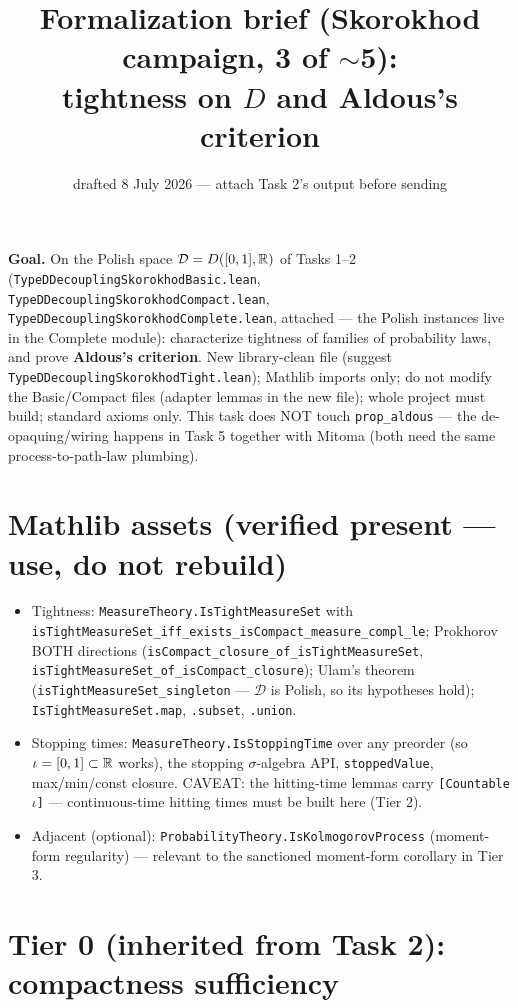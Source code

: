 \documentclass[11pt]{article}
\title{Formalization brief (Skorokhod campaign, 3 of $\sim$5):\\
tightness on $D$ and Aldous's criterion}
\date{drafted 8 July 2026 --- attach Task 2's output before sending}
\theoremstyle{plain}
\theoremstyle{remark}
\newcommand{\D}{\mathcal D}
\begin{document}
\maketitle

\noindent\textbf{Goal.} On the Polish space $\D = D([0,1],\R)$ of Tasks 1--2
(\texttt{TypeDDecouplingSkorokhodBasic.lean},
\texttt{TypeDDecouplingSkorokhodCompact.lean},
\texttt{TypeDDecouplingSkorokhodComplete.lean}, attached --- the Polish
instances live in the Complete module): characterize
tightness of families of probability laws, and prove \textbf{Aldous's
criterion}. New library-clean file (suggest
\texttt{TypeDDecouplingSkorokhodTight.lean}); Mathlib imports only; do not
modify the Basic/Compact files (adapter lemmas in the new file); whole project
must build; standard axioms only. This task does NOT touch
\texttt{prop\_aldous} --- the de-opaquing/wiring happens in Task 5 together
with Mitoma (both need the same process-to-path-law plumbing).

\section*{Mathlib assets (verified present --- use, do not rebuild)}

\begin{itemize}
\item Tightness: \texttt{MeasureTheory.IsTightMeasureSet} with
\texttt{isTightMeasureSet\_iff\_exists\_isCompact\_measure\_compl\_le};
Prokhorov BOTH directions
(\texttt{isCompact\_closure\_of\_isTightMeasureSet},
\texttt{isTightMeasureSet\_of\_isCompact\_closure}); Ulam's theorem
(\texttt{isTightMeasureSet\_singleton} --- $\D$ is Polish, so its hypotheses
hold); \texttt{IsTightMeasureSet.map}, \texttt{.subset}, \texttt{.union}.
\item Stopping times: \texttt{MeasureTheory.IsStoppingTime} over any preorder
(so $\iota=[0,1]\subset\mathbb{R}$ works), the stopping $\sigma$-algebra API,
\texttt{stoppedValue}, max/min/const closure. CAVEAT: the hitting-time
lemmas carry \texttt{[Countable $\iota$]} --- continuous-time hitting times
must be built here (Tier 2).
\item Adjacent (optional): \texttt{ProbabilityTheory.IsKolmogorovProcess}
(moment-form regularity) --- relevant to the sanctioned moment-form
corollary in Tier 3.
\end{itemize}

\section*{Tier 0 (inherited from Task 2): compactness sufficiency}
\end{document}
